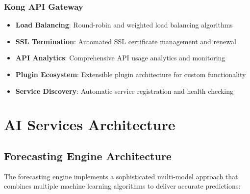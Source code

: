 \subsubsection{Kong API Gateway}
\begin{itemize}
    \item \textbf{Load Balancing}: Round-robin and weighted load balancing algorithms
    \item \textbf{SSL Termination}: Automated SSL certificate management and renewal
    \item \textbf{API Analytics}: Comprehensive API usage analytics and monitoring
    \item \textbf{Plugin Ecosystem}: Extensible plugin architecture for custom functionality
    \item \textbf{Service Discovery}: Automatic service registration and health checking
\end{itemize}

\section{AI Services Architecture}

\subsection{Forecasting Engine Architecture}

The forecasting engine implements a sophisticated multi-model approach that combines multiple machine learning algorithms to deliver accurate predictions:

